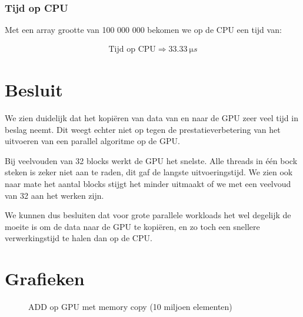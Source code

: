 \documentclass[twoside,a4paper]{article}
\begin{document}
\subsubsection{Tijd op CPU}
Met een array grootte van 100 000 000 bekomen we op de CPU een tijd van:

\begin{align*}
    \text{Tijd op CPU} \Rightarrow \SI{33.33}{\micro s}
\end{align*}

\newpage
\section{Besluit}

We zien duidelijk dat het kopi\"eren van data van en naar de GPU zeer veel tijd in beslag neemt. Dit weegt echter niet op tegen de prestatieverbetering van het uitvoeren van een parallel algoritme op de GPU.

Bij veelvouden van 32 blocks werkt de GPU het snelste. Alle threads in \'e\'en bock steken is zeker niet aan te raden, dit gaf de langste uitvoeringstijd. We zien ook naar mate het aantal blocks stijgt het minder uitmaakt of we met een veelvoud van 32 aan het werken zijn.

We kunnen dus besluiten dat voor grote parallele workloads het wel degelijk de moeite is om de data naar de GPU te kopi\"eren, en zo toch een snellere verwerkingstijd te halen dan op de CPU.




\newpage
\appendix
\section{Grafieken}
\label{grafieken}

\begin{figure}[H]
    \centering
    
    \caption{ADD op GPU met memory copy (10 miljoen elementen)}
    \label{fig:ADD_gpu_with_memcopy_10mil_goed}
\end{figure}
\end{document}
